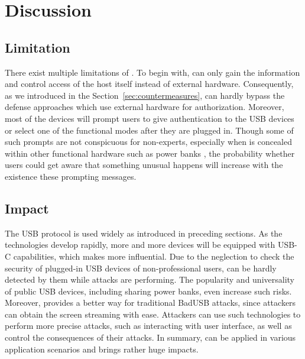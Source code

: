 \section{Discussion}
\label{sec:discussion}

\subsection{Limitation}

There exist multiple limitations of \tool.  To begin with, \tool can only gain
the information and control access of the host itself instead of external
hardware.  Consequently, as we introduced in the
Section~\ref{sec:countermeasures}, \tool can hardly bypass the defense
approaches which use external hardware for authorization.  Moreover, most of
the devices will prompt users to give authentication to the USB devices or
select one of the functional modes after they are plugged in.  Though some of
such prompts are not conspicuous for non-experts, especially when \tool is
concealed within other functional hardware such as power banks , the probability whether users could get
aware that something unusual happens will increase with the existence these
prompting messages.

\subsection{Impact}

The USB protocol is used widely as introduced in preceding sections.  As the
technologies develop rapidly, more and more devices will be equipped with USB-C
capabilities, which makes \tool more influential.  Due to the neglection to
check the security of plugged-in USB devices of non-professional users, \tool
can be hardly detected by them while attacks are performing.  The popularity
and universality of public USB devices, including sharing power banks, even
increase such risks.  Moreover, \tool provides a better way for traditional
BadUSB attacks, since attackers can obtain the screen streaming with ease.
Attackers can use such technologies to perform more precise attacks, such as
interacting with user interface, as well as control the consequences of their
attacks.  In summary, \tool can be applied in various application scenarios and
brings rather huge impacts.
